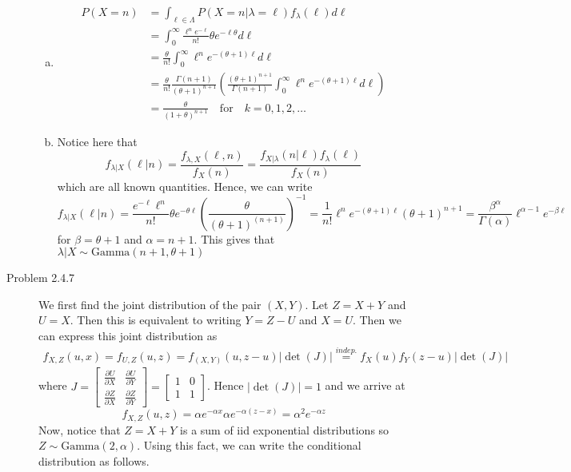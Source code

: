 \documentclass[12pt]{article}  %
\begin{document}
\begin{description}
\begin{enumerate}[(a)]
\item \begin{align*}
P(X = n) &= \int_{\ell\in\Lambda}P(X=n|\lambda = \ell)f_{\lambda}(\ell)d\ell\\
&= \int_0^{\infty}\frac{\ell^ne^{-\ell}}{n!}\theta e^{-\ell\theta}d\ell\\
&= \frac{\theta}{n!}\int_0^{\infty}\ell^ne^{-(\theta+1)\ell}d\ell\\
&= \frac{\theta}{n!}\frac{\Gamma(n+1)}{(\theta+1)^{n+1}}\left(\frac{(\theta+1)^{n+1}}{\Gamma(n+1)}\int_0^{\infty}\ell^ne^{-(\theta+1)\ell}d\ell\right)\\
&= \frac{\theta}{(1+\theta)^{n+1}}\hspace{1em}\text{for}\hspace{1em}k = 0, 1, 2, \ldots
\end{align*}

\item Notice here that $$f_{\lambda|X}(\ell|n) = \frac{f_{\lambda,X}(\ell, n)}{f_{X}(n)} = \frac{f_{X|\lambda}(n|\ell)f_{\lambda}(\ell)}{f_{X}(n)}$$
which are all known quantities. Hence, we can write 
$$f_{\lambda|X}(\ell|n) = \frac{e^{-\ell}\ell^n}{n!}\theta e^{-\theta\ell}\left(\frac{\theta}{(\theta+1)^{(n+1)}}\right)^{-1} = \frac{1}{n!}\ell^{n}e^{-(\theta+1)\ell}(\theta+1)^{n+1} = \frac{\beta^{\alpha}}{\Gamma(\alpha)}\ell^{\alpha - 1}e^{-\beta\ell}$$
for $\beta = \theta + 1$ and $\alpha = n+1$. This gives that $\lambda|X\sim\text{Gamma}(n+1, \theta + 1)$
\end{enumerate}


\item[Problem 2.4.7] We first find the joint distribution of the pair $(X,Y)$. Let $Z = X + Y$ and $U = X$. Then this is equivalent to writing $Y = Z-U$ and $X = U$. Then we can express this joint distribution as 
\begin{align*}
f_{X,Z}(u, x) = f_{U, Z}(u,z) = f_{(X,Y)}(u, z-u)|\det(J)| \overset{indep.}{=} f_X(u)f_Y(z-u)|\det(J)|
\end{align*}
where $J = \begin{bmatrix}\frac{\partial U}{\partial X} & \frac{\partial U}{\partial Y}\\\frac{\partial Z}{\partial X} & \frac{\partial Z}{\partial Y}\end{bmatrix} =\begin{bmatrix}1 & 0\\ 1 & 1\end{bmatrix}$. Hence $|\det(J)| = 1$ and we arrive at $$f_{X,Z}(u,z) = \alpha e^{-\alpha x}\alpha e^{-\alpha(z-x)} = \alpha^2e^{-\alpha z}$$
Now, notice that $Z = X+Y$ is a sum of iid exponential distributions so $Z \sim\text{Gamma}(2,\alpha)$. Using this fact, we can write the conditional distribution as follows. 


\end{description}
\end{document}
